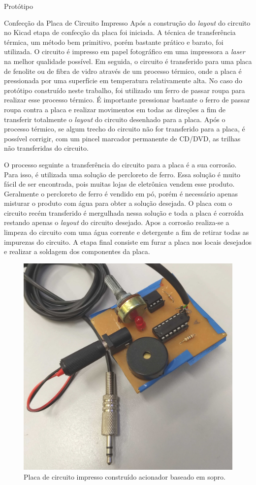 \begin{chapter}{Protótipo}
\begin{section}{Confecção da Placa de Circuito Impresso}
Após a construção do \textit{layout} do circuito no Kicad etapa de confecção da
placa foi iniciada. A técnica de transferência térmica, um método bem primitivo,
porém bastante prático e barato, foi utilizada. O circuito é impresso em papel
fotográfico em uma impressora a \textit{laser} na melhor qualidade possível. Em
seguida, o circuito é transferido para uma placa de fenolite ou de fibra de
vidro através de um processo térmico, onde a placa é pressionada por uma
superfície em temperatura relativamente alta. No caso do protótipo construído
neste trabalho, foi utilizado um ferro de passar roupa para realizar esse
processo térmico. É importante pressionar bastante o ferro de passar roupa
contra a placa e realizar movimentos em todas as direções a fim de transferir
totalmente o \textit{layout} do circuito desenhado para a placa. Após o processo
térmico, se algum trecho do circuito não for transferido para a placa, é
possível corrigir, com um pincel marcador permanente de CD/DVD, as trilhas não
transferidas do circuito. 

O processo seguinte a transferência do circuito para a placa é a sua corrosão.
Para isso, é utilizada uma solução de percloreto de ferro. Essa solução é
muito fácil de ser encontrada, pois muitas lojas de eletrônica vendem esse
produto. Geralmente o percloreto de ferro é vendido em pó, porém é necessário
apenas misturar o produto com água para obter a solução desejada. O placa com o
circuito recém transferido é mergulhada nessa solução e toda a placa é corroída
restando apenas o \textit{layout} do circuito desejado. Apos a corrosão 
realiza-se a limpeza do circuito com uma água corrente e detergente a fim de
retirar todas as impurezas do circuito. A etapa final consiste em furar a
placa nos locais desejados e realizar a soldagem dos componentes da placa.

\begin{figure}[!h]
	\centering
	\begin{minipage}[c]{\textwidth}
	\centering
	\includegraphics[width=0.45\linewidth]{fig/puff2}
	\caption{Placa de circuito impresso construído acionador baseado em sopro.}
	\label{fig:placa}
	\end{minipage}
\end{figure} 


\end{section}
\end{chapter}
